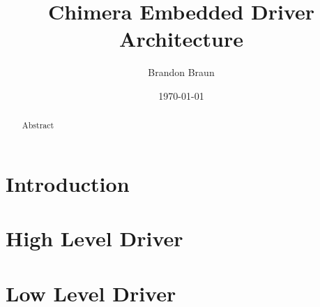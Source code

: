 \documentclass[10pt, letterpaper]{article}
\title{Chimera Embedded Driver Architecture}
\author{Brandon Braun}
\date{\today}
\begin{document}
  \begin{titlepage}
    \maketitle
  \end{titlepage}

  \begin{abstract}
    Abstract
  \end{abstract}

  \section{Introduction}

  \section{High Level Driver}

  \section{Low Level Driver}
  \begin{flushleft}

  \end{flushleft}
\end{document}
